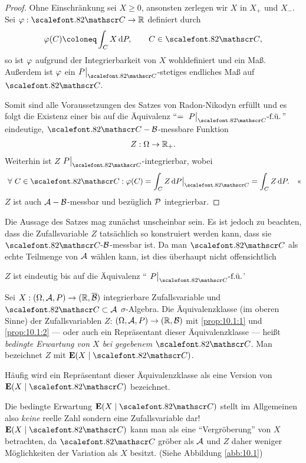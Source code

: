 \begin{proof}
Ohne Einschränkung sei $X\ge 0$, ansonsten zerlegen wir $X$ in $X_+$ und $X_-$.
Sei $\ph: \CC \to \R$ definiert durch
\begin{align*}
\ph(C) \defl \int_C X\dP,\qquad C\in \CC,
\end{align*}
so ist $\ph$ aufgrund der Integrierbarkeit von $X$ wohldefiniert und ein Maß.
Außerdem ist $\ph$ ein $P\big|_{\CC}$-stetiges endliches Maß auf $\CC$.

Somit sind alle Voraussetzungen des Satzes von Radon-Nikodyn erfüllt und es
folgt die Existenz einer bis auf die Äquivalenz ``$=\fu{P\big|_\CC}$''
eindeutige, $\CC-\BB$-messbare Funktion
\begin{align*}
Z: \Omega\to \R_+.
\end{align*}
Weiterhin ist $Z$ $P\big|_{\CC}$-integrierbar, wobei
\begin{align*}
\forall C\in\CC : \ph(C) = \int_C Z \dP\big|_{\CC}
=  \int_C Z \dP.\qedhere
\end{align*}
$Z$ ist auch $\AA-\BB$-messbar und bezüglich $\PP$ integrierbar.\qedhere
\end{proof}

Die Aussage des Satzes mag zunächst unscheinbar sein. Es ist jedoch zu
beachten, dass die Zufallsvariable $Z$ tatsächlich so konstruiert werden kann,
dass sie $\CC$-$\BB$-messbar ist. Da man $\CC$ als echte Teilmenge von $\AA$
wählen kann, ist dies überhaupt nicht offensichtlich

$Z$ ist eindeutig bis auf die Äquivalenz ``$\fu{P\big|_{\CC}}$'

\begin{defn}
\label{defn:10.1}
Sei $X : (\Omega, {\AA},P)\to (\R, \overline{\BB})$
integrierbare Zufallsvariable und ${\CC}\subset {\AA}$
$\sigma$-Algebra. Die Äquivalenzklasse (im oberen
Sinne) der Zufallsvariablen $Z$: $(\Omega , {\AA}, P) \to (\R , {\BB})$ mit
\ref{prop:10.1:1} und \ref{prop:10.1:2} --- oder auch ein Repräsentant dieser
Äquivalenzklasse --- heißt \emph{bedingte Erwartung von $X$ bei gegebenem
  ${\CC}$}. Man bezeichnet $Z$ mit $\E(X\mid {\CC})$.

Häufig wird ein Repräsentant dieser Äquivalenzklasse als eine Version von
$\E(X\mid {\CC})$ bezeichnet.\fishhere
\end{defn}

Die bedingte Erwartung $\E(X\mid {\CC})$ stellt im Allgemeinen also
\textit{keine} reelle Zahl sondern eine Zufallsvariable dar! $\E(X\mid {\CC})$
kann man als eine ``Vergröberung'' von $X$ betrachten, da $\CC$ gröber als
$\AA$ und $Z$ daher weniger Möglichkeiten der Variation als $X$ besitzt.
(Siehe Abbildung \ref{abb:10.1})

